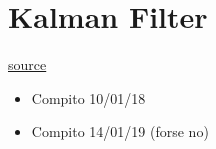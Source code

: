 \chapter{Kalman Filter}

\href{https://www.mit.edu/course/16/16.070/www/project/PF_kalman_intro.pdf}{source}
\begin{itemize}
    \item Compito 10/01/18
    \item Compito 14/01/19 (forse no)
\end{itemize}